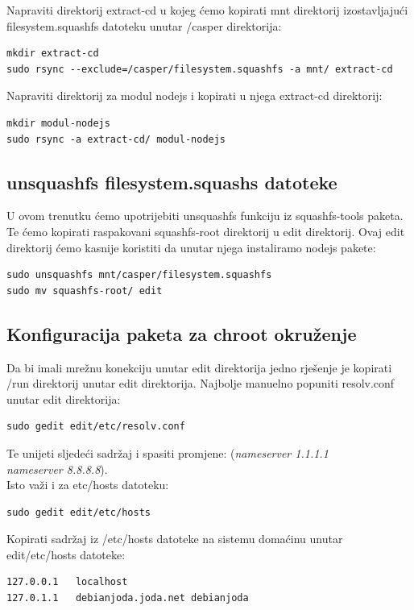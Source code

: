\documentclass[12pt,vi]{mitthesis}
\begin{document}
\noindent
Napraviti direktorij extract-cd u kojeg ćemo kopirati mnt direktorij izostavljajući filesystem.squashfs datoteku unutar /casper direktorija:
\begin{lstlisting}[style=BashInputStyle]
mkdir extract-cd
sudo rsync --exclude=/casper/filesystem.squashfs -a mnt/ extract-cd
\end{lstlisting}

\noindent
Napraviti direktorij za modul nodejs i kopirati u njega extract-cd direktorij:
\begin{lstlisting}[style=BashInputStyle]
mkdir modul-nodejs
sudo rsync -a extract-cd/ modul-nodejs
\end{lstlisting}

\subsection*{unsquashfs filesystem.squashs datoteke}
\noindent
U ovom trenutku ćemo upotrijebiti unsquashfs funkciju iz squashfs-tools paketa. Te ćemo kopirati raspakovani squashfs-root direktorij u edit direktorij. Ovaj edit direktorij ćemo kasnije koristiti da unutar njega instaliramo nodejs pakete:
\begin{lstlisting}[style=BashInputStyle]
sudo unsquashfs mnt/casper/filesystem.squashfs
sudo mv squashfs-root/ edit
\end{lstlisting}

\subsection*{Konfiguracija paketa za chroot okruženje}
\indent
Da bi imali mrežnu konekciju unutar edit direktorija jedno rješenje je kopirati /run direktorij unutar edit direktorija.
Najbolje manuelno popuniti resolv.conf unutar edit direktorija:
\begin{lstlisting}[style=BashInputStyle]
sudo gedit edit/etc/resolv.conf
\end{lstlisting}
Te unijeti sljedeći sadržaj i spasiti promjene:
(\textit{nameserver 1.1.1.1 \\
nameserver 8.8.8.8}).\\
\noindent
Isto važi i za etc/hosts datoteku:
\begin{lstlisting}[style=BashInputStyle]
sudo gedit edit/etc/hosts
\end{lstlisting}
Kopirati sadržaj iz /etc/hosts datoteke na sistemu domaćinu unutar edit/etc/hosts datoteke:
\begin{lstlisting}
127.0.0.1	localhost
127.0.1.1	debianjoda.joda.net	debianjoda
\end{lstlisting}
\end{document}
